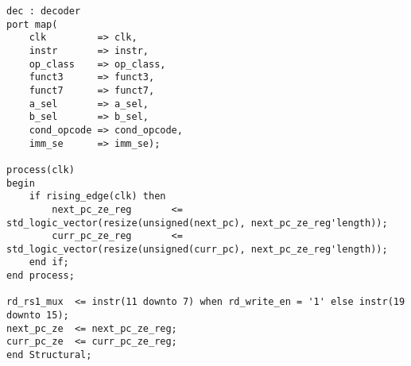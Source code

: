 \begin{code}
\begin{verbatim}
dec : decoder
port map(
    clk         => clk,
    instr       => instr,
    op_class    => op_class,
    funct3      => funct3,
    funct7      => funct7,
    a_sel       => a_sel,
    b_sel       => b_sel,
    cond_opcode => cond_opcode,
    imm_se      => imm_se);

process(clk)
begin
    if rising_edge(clk) then
        next_pc_ze_reg       <= std_logic_vector(resize(unsigned(next_pc), next_pc_ze_reg'length));
        curr_pc_ze_reg       <= std_logic_vector(resize(unsigned(curr_pc), next_pc_ze_reg'length));
    end if;
end process;

rd_rs1_mux  <= instr(11 downto 7) when rd_write_en = '1' else instr(19 downto 15);
next_pc_ze  <= next_pc_ze_reg;
curr_pc_ze  <= curr_pc_ze_reg;
end Structural;
\end{verbatim}
\end{code}

